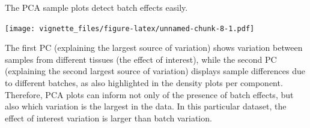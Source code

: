 \documentclass[]{book}
\newenvironment{Shaded}{\begin{snugshade}}{\end{snugshade}}
\newcommand{\KeywordTok}[1]{\textcolor[rgb]{0.13,0.29,0.53}{\textbf{#1}}}
\newcommand{\DataTypeTok}[1]{\textcolor[rgb]{0.13,0.29,0.53}{#1}}
\newcommand{\DecValTok}[1]{\textcolor[rgb]{0.00,0.00,0.81}{#1}}
\newcommand{\FloatTok}[1]{\textcolor[rgb]{0.00,0.00,0.81}{#1}}
\newcommand{\StringTok}[1]{\textcolor[rgb]{0.31,0.60,0.02}{#1}}
\newcommand{\OperatorTok}[1]{\textcolor[rgb]{0.81,0.36,0.00}{\textbf{#1}}}
\newcommand{\NormalTok}[1]{#1}
\begin{document}
The PCA sample plots detect batch effects easily.

\begin{Shaded}
\end{Shaded}

\texttt{[image: vignette\_files/figure-latex/unnamed-chunk-8-1.pdf]}

The first PC (explaining the largest source of variation) shows
variation between samples from different tissues (the effect of
interest), while the second PC (explaining the second largest source of
variation) displays sample differences due to different batches, as also
highlighted in the density plots per component. Therefore, PCA plots can
inform not only of the presence of batch effects, but also which
variation is the largest in the data. In this particular dataset, the
effect of interest variation is larger than batch variation.

\begin{Shaded}
\end{Shaded}
\end{document}
